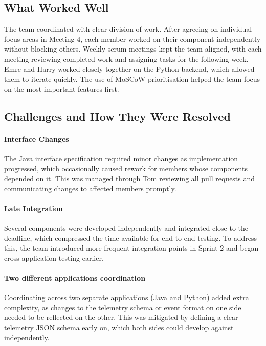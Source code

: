 \subsection{What Worked Well}
The team coordinated with clear division of work. After agreeing on individual focus areas in Meeting 4, each member worked on their component independently without blocking others. Weekly scrum meetings kept the team aligned, with each meeting reviewing completed work and assigning tasks for the following week. Emre and Harry worked closely together on the Python backend, which allowed them to iterate quickly. The use of MoSCoW prioritisation helped the team focus on the most important features first.

\subsection{Challenges and How They Were Resolved}

\paragraph{Interface Changes}
The Java interface specification required minor changes as implementation progressed, which occasionally caused rework for members whose components depended on it. This was managed through Tom reviewing all pull requests and communicating changes to affected members promptly.

\paragraph{Late Integration}
Several components were developed independently and integrated close to the deadline, which compressed the time available for end-to-end testing. To address this, the team introduced more frequent integration points in Sprint 2 and began cross-application testing earlier.

\paragraph{Two different applications coordination}
Coordinating across two separate applications (Java and Python) added extra complexity, as changes to the telemetry schema or event format on one side needed to be reflected on the other. This was mitigated by defining a clear telemetry JSON schema early on, which both sides could develop against independently.

